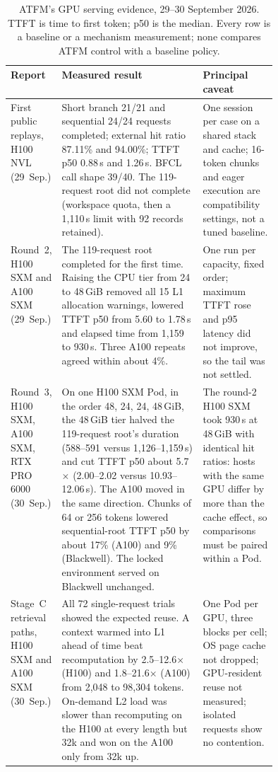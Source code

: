 \begin{table}[tbp]\centering\small
\caption{ATFM's GPU serving evidence, 29--30 September 2026. TTFT is time to
first token; p50 is the median. Every row is a baseline or a mechanism
measurement; none compares ATFM control with a baseline policy.}\label{tab:measured}
\begin{tabularx}{\linewidth}{@{}>{\raggedright\arraybackslash}p{0.15\linewidth}>{\raggedright\arraybackslash}X>{\raggedright\arraybackslash}p{0.29\linewidth}@{}}
\toprule Report & Measured result & Principal caveat\\\midrule
First public replays, H100 NVL (29~Sep.) &
Short branch 21/21 and sequential 24/24 requests completed; external hit ratio
87.11\% and 94.00\%; TTFT p50 0.88\,s and 1.26\,s. BFCL call shape 39/40. The
119-request root did not complete (workspace quota, then a 1,110\,s limit with
92 records retained). &
One session per case on a shared stack and cache; 16-token chunks and eager
execution are compatibility settings, not a tuned baseline.\\
\addlinespace[3pt]
Round~2, H100 SXM and A100 SXM (29~Sep.) &
The 119-request root completed for the first time. Raising the CPU tier from
24 to 48\,GiB removed all 15 L1 allocation warnings, lowered TTFT p50 from 5.60
to 1.78\,s and elapsed time from 1,159 to 930\,s. Three A100 repeats agreed
within about 4\%. &
One run per capacity, fixed order; maximum TTFT rose and p95 latency did not
improve, so the tail was not settled.\\
\addlinespace[3pt]
Round~3, H100 SXM, A100 SXM, RTX PRO 6000 (30~Sep.) &
On one H100 SXM Pod, in the order 48, 24, 24, 48\,GiB, the 48\,GiB tier halved
the 119-request root's duration (588--591 versus 1,126--1,159\,s) and cut TTFT
p50 about 5.7$\times$ (2.00--2.02 versus 10.93--12.06\,s). The A100 moved in
the same direction. Chunks of 64 or 256 tokens lowered sequential-root TTFT p50
by about 17\% (A100) and 9\% (Blackwell). The locked environment served on
Blackwell unchanged. &
The round-2 H100 SXM took 930\,s at 48\,GiB with identical hit ratios: hosts
with the same GPU differ by more than the cache effect, so comparisons must be
paired within a Pod.\\
\addlinespace[3pt]
Stage~C retrieval paths, H100 SXM and A100 SXM (30~Sep.) &
All 72 single-request trials showed the expected reuse. A context warmed into
L1 ahead of time beat recomputation by 2.5--12.6$\times$ (H100) and
1.8--21.6$\times$ (A100) from 2,048 to 98,304 tokens. On-demand L2 load was
slower than recomputing on the H100 at every length but 32k and won on the A100
only from 32k up. &
One Pod per GPU, three blocks per cell; OS page cache not dropped; GPU-resident
reuse not measured; isolated requests show no contention.\\\bottomrule
\end{tabularx}\end{table}

